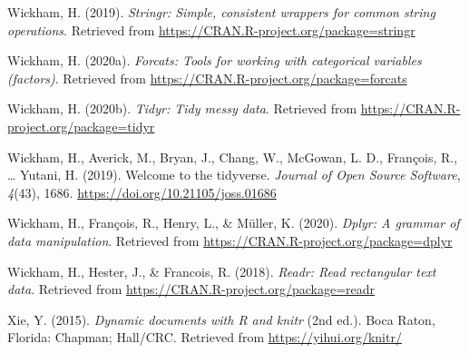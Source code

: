 \documentclass[
  english,
  man]{apa6}
\begin{document}
\leavevmode\hypertarget{ref-R-stringr}{}%
Wickham, H. (2019). \emph{Stringr: Simple, consistent wrappers for common string operations}. Retrieved from \url{https://CRAN.R-project.org/package=stringr}

\leavevmode\hypertarget{ref-R-forcats}{}%
Wickham, H. (2020a). \emph{Forcats: Tools for working with categorical variables (factors)}. Retrieved from \url{https://CRAN.R-project.org/package=forcats}

\leavevmode\hypertarget{ref-R-tidyr}{}%
Wickham, H. (2020b). \emph{Tidyr: Tidy messy data}. Retrieved from \url{https://CRAN.R-project.org/package=tidyr}

\leavevmode\hypertarget{ref-R-tidyverse}{}%
Wickham, H., Averick, M., Bryan, J., Chang, W., McGowan, L. D., François, R., \ldots{} Yutani, H. (2019). Welcome to the tidyverse. \emph{Journal of Open Source Software}, \emph{4}(43), 1686. \url{https://doi.org/10.21105/joss.01686}

\leavevmode\hypertarget{ref-R-dplyr}{}%
Wickham, H., François, R., Henry, L., \& Müller, K. (2020). \emph{Dplyr: A grammar of data manipulation}. Retrieved from \url{https://CRAN.R-project.org/package=dplyr}

\leavevmode\hypertarget{ref-R-readr}{}%
Wickham, H., Hester, J., \& Francois, R. (2018). \emph{Readr: Read rectangular text data}. Retrieved from \url{https://CRAN.R-project.org/package=readr}

\leavevmode\hypertarget{ref-R-knitr}{}%
Xie, Y. (2015). \emph{Dynamic documents with R and knitr} (2nd ed.). Boca Raton, Florida: Chapman; Hall/CRC. Retrieved from \url{https://yihui.org/knitr/}

\endgroup
\end{document}
